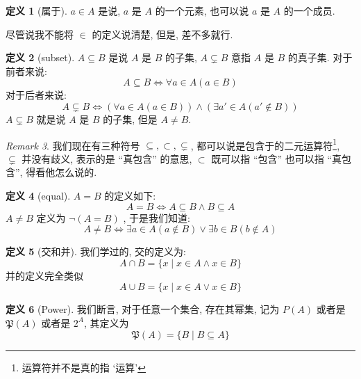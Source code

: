 \documentclass[10pt]{ctexart}
\theoremstyle{definition}
\theoremstyle{definition}
\newtheorem{definition}{定义}[section]
\theoremstyle{plain}
\theoremstyle{remark}
\newtheorem{remark}[definition]{Remark}
\begin{document}
\begin{definition}[属于]
 \(a \in A \) 是说, \(a\) 是 \(A\) 的一个元素, 也可以说 \(a\) 是 \(A\) 的一个成员. 
\end{definition}
尽管说我不能将 \(\in\) 的定义说清楚, 但是, 差不多就行. 
\begin{definition}[subset] 
\(A \subseteq B \) 是说 \(A \) 是 \(B\) 的子集, \(A \subsetneq B\) 意指 \(A\) 是 \(B\) 的真子集. 对于前者来说: 
\begin{equation}
A \subseteq B \iff \forall a \in A (a \in B)
\end{equation}
对于后者来说: 
\begin{equation}
A \subsetneq B \iff (\forall a \in A (a \in B)) \wedge (\exists a' \in A  (a' \notin B))
\end{equation}
\(A \subsetneq B\) 就是说 \(A\) 是 \(B\) 的子集, 但是 \(A \ne B \). 
\end{definition}
\begin{remark}
我们现在有三种符号 \(\subseteq , \subset , \subsetneq\), 都可以说是包含于的二元运算符\footnote{运算符并不是真的指 `运算'}, \(\subsetneq\) 并没有歧义, 表示的是 ``真包含'' 的意思, \(\subset\) 既可以指 ``包含'' 也可以指 ``真包含'', 得看他怎么说的.
\end{remark}
\begin{definition}[equal]
\(A = B \) 的定义如下: 
\begin{equation}
A = B \iff A \subseteq B \wedge B \subseteq A 
\end{equation}
\(A \ne B \) 定义为 \(\neg (A = B ) \) , 于是我们知道: 
\begin{equation}
A \ne B \iff  \exists a \in A (a \notin B) \vee \exists b \in B (b \notin A) 
\end{equation}
\end{definition}
\begin{definition}[交和并]
我们学过的, 交的定义为: 
\begin{equation}
A \cap B = \{ x \mid x \in A \wedge x \in B \} 
\end{equation}
并的定义完全类似
\begin{equation}
		A \cup B = \{ x \mid x \in A \vee x \in B \} 
\end{equation}
\end{definition}
\begin{definition}[Power] 
我们断言, 对于任意一个集合, 存在其幂集, 记为 \(P (A) \) 或者是 \(\mathfrak P (A) \) 或者是 \(2 ^{A}\), 其定义为
\begin{equation}
\mathfrak P (A)  = \{ B \mid B \subseteq A \} 
\end{equation}
\end{definition}
\end{document}
